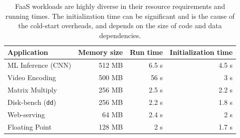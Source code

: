 \begin{table}
  \centering
  \caption{FaaS workloads are highly diverse in their resource requirements and running times. The initialization time can be significant and is the cause of the cold-start overheads, and depends on the size of code and data dependencies.}
  \begin{tabular}{lrrr}
    \hline 
    Application & Memory size & Run time & Initialization time \\
    \hline
    ML Inference (CNN) & 512 MB & 6.5 s & 4.5 s \\
    Video Encoding & 500 MB & 56 s & 3 s \\
    Matrix Multiply & 256 MB & 2.5 s & 2.2 s \\
    Disk-bench (\texttt{dd})  & 256 MB & 2.2 s & 1.8 s \\
    Web-serving & 64 MB & 2.4 s & 2 s \\
    Floating Point & 128 MB & 2 s & 1.7 s \\
    \hline
  \end{tabular}
  \label{tab:bg-workloads}
\end{table}





